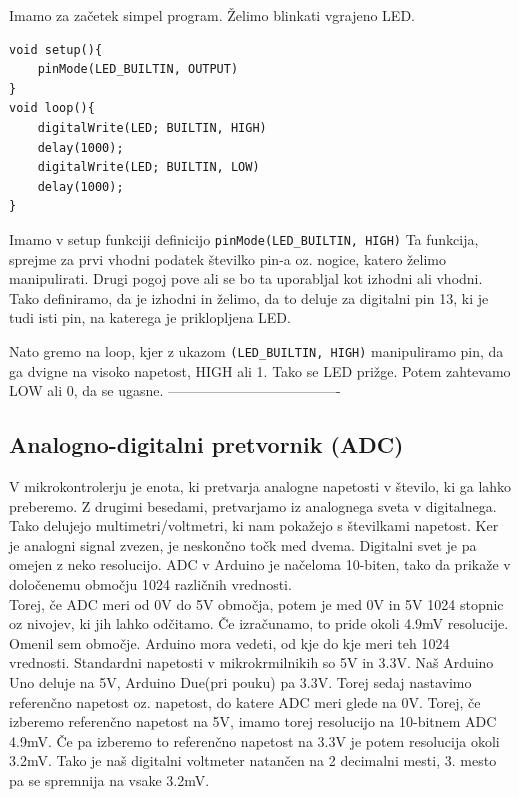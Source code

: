 \documentclass[a4paper, 12pt]{article}
\begin{document}
Imamo za začetek simpel program. Želimo blinkati vgrajeno LED.

\begin{lstlisting}
void setup(){
	pinMode(LED_BUILTIN, OUTPUT)
}
void loop(){
	digitalWrite(LED; BUILTIN, HIGH)
	delay(1000);
	digitalWrite(LED; BUILTIN, LOW)
	delay(1000);
}
\end{lstlisting}

Imamo v setup funkciji definicijo \textcolor{dkgreen}{\texttt{pinMode(LED\_BUILTIN, HIGH)}} Ta funkcija, sprejme za prvi vhodni podatek številko pin-a oz. nogice, katero želimo manipulirati. Drugi pogoj pove ali se bo ta uporabljal kot izhodni ali vhodni. Tako definiramo, da je izhodni in želimo, da to deluje za digitalni pin 13, ki je tudi isti pin, na katerega je priklopljena LED.\

Nato gremo na loop, kjer z ukazom \textcolor{dkgreen}{\texttt{(LED\_BUILTIN, HIGH)}} manipuliramo pin, da ga dvigne na visoko napetost, HIGH ali 1. Tako se LED prižge. Potem zahtevamo LOW ali 0, da se ugasne.
-------------------------------------
 
\subsection{Analogno-digitalni pretvornik (ADC)}

V mikrokontrolerju je enota, ki pretvarja analogne napetosti v število, ki ga lahko preberemo. Z drugimi besedami, pretvarjamo iz analognega sveta v digitalnega. Tako delujejo multimetri/voltmetri, ki nam pokažejo s številkami napetost. Ker je analogni signal zvezen, je neskončno točk med dvema. Digitalni svet je pa omejen z neko resolucijo. ADC v Arduino je načeloma 10-biten, tako da prikaže v določenemu območju 1024 različnih vrednosti.\\

Torej, če ADC meri od 0V do 5V območja, potem je med 0V in 5V 1024 stopnic oz nivojev, ki jih lahko odčitamo. Če izračunamo, to pride  okoli 4.9mV resolucije.\\

Omenil sem območje. Arduino mora vedeti, od kje do kje meri teh 1024 vrednosti. Standardni napetosti v mikrokrmilnikih so 5V in 3.3V. Naš Arduino Uno deluje na 5V, Arduino Due(pri pouku) pa 3.3V. Torej sedaj nastavimo referenčno napetost oz. napetost, do katere ADC meri glede na 0V. Torej, če izberemo referenčno napetost na 5V, imamo torej resolucijo na 10-bitnem ADC 4.9mV. Če pa izberemo to referenčno napetost na 3.3V je potem resolucija okoli 3.2mV. Tako je naš digitalni voltmeter natančen na 2 decimalni mesti, 3. mesto pa se spremnija na vsake 3.2mV.\\
\end{document}
